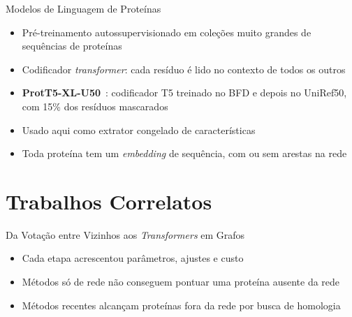 \documentclass[aspectratio=169,11pt]{beamer}
\begin{document}
\begin{frame}{Modelos de Linguagem de Proteínas}
  \begin{itemize}\setlength{\itemsep}{0.5em}
    \item Pré-treinamento autossupervisionado em coleções muito grandes de sequências de proteínas
    \item Codificador \textit{transformer}: cada resíduo é lido no contexto de todos os outros
    \item \textbf{ProtT5-XL-U50}~\cite{elnaggar2021prottrans}: codificador T5 treinado no BFD e depois no UniRef50, com
      15\% dos resíduos mascarados
    \item Usado aqui como extrator congelado de características
    \item Toda proteína tem um \textit{embedding} de sequência, com ou sem arestas na rede
  \end{itemize}
\end{frame}

\section{Trabalhos Correlatos}

\begin{frame}{Da Votação entre Vizinhos aos \textit{Transformers} em Grafos}
  \begin{center}
  \end{center}
  \vspace{0.3em}
  \begin{itemize}\setlength{\itemsep}{0.4em}
    \item Cada etapa acrescentou parâmetros, ajustes e custo
    \item Métodos só de rede não conseguem pontuar uma proteína ausente da rede
    \item Métodos recentes alcançam proteínas fora da rede por busca de homologia
  \end{itemize}
\end{frame}
\end{document}
